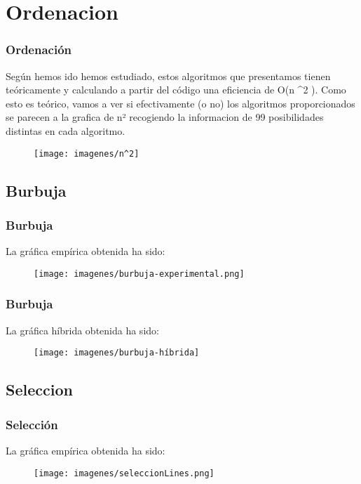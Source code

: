 \documentclass{beamer}
\begin{document}
\section{Ordenacion} %
\begin{frame}
	\frametitle{Ordenación}
	Según hemos ido hemos estudiado, estos algoritmos que presentamos tienen teóricamente y calculando a partir del código una eficiencia de O(n ^2 ). Como esto es teórico, vamos a ver si efectivamente (o no) los algoritmos proporcionados se parecen a la grafica de n² recogiendo la informacion de 99 posibilidades distintas en cada algoritmo.
	\begin{figure}
		\centering
		\texttt{[image: imagenes/n^2]}
		\caption{}
		\label{fig:E1}
	\end{figure}

\end{frame}

\subsection{Burbuja}
\begin{frame}
	\frametitle{Burbuja}
	La gráfica empírica obtenida ha sido:
	\begin{figure}
		\centering
		\texttt{[image: imagenes/burbuja-experimental.png]}
		\caption{}
		\label{fig:E2}
	\end{figure}
	
\end{frame}

\begin{frame}
	\frametitle{Burbuja}
	La gráfica híbrida obtenida ha sido:
	\begin{figure}
		\centering
		\texttt{[image: imagenes/burbuja-híbrida]}
		\caption{}
		\label{fig:E3}
	\end{figure}	
\end{frame}





\subsection{Seleccion}
\begin{frame}
	\frametitle{Selección}
	La gráfica empírica obtenida ha sido:
	\begin{figure}
		\centering
		\texttt{[image: imagenes/seleccionLines.png]}
		\caption{}
		\label{fig:E4}
	\end{figure}
	
\end{frame}
\end{document}
